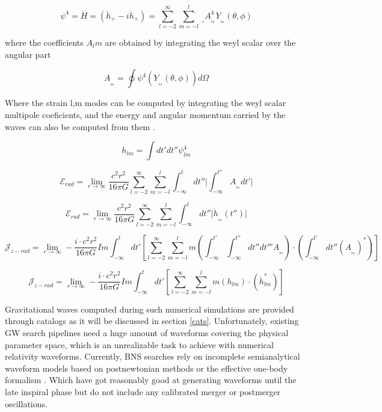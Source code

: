 \begin{equation}
\psi^4 = \ddot{H} = (\ddot{h}_+ - i\ddot{h}_\times) = \sum_{l=-2}^{\infty}  \sum_{m=-l}^{l} {}_{_{_{-2}}}A_{_{_{lm}}}^4 Y_{_{_{lm}}}(\theta, \phi) 
\end{equation}

where the coefficients $A_lm$ are obtained by integrating the weyl scalar over the angular  part 

\begin{equation}
A_{_{_{lm}}} = \oint \psi^4(Y_{_{_{lm}}}(\theta, \phi)) d\Omega
\end{equation}


Where the strain l,m modes can be computed by integrating the weyl scalar multipole coeficients, and the energy and angular momentum carried by the waves can also be computed from them \cite{Ruiz_2007}.

\begin{equation}
h_{lm} = \int dt' dt'' \psi_{lm}^4
\end{equation}

\begin{equation}
\mathcal{E}_{rad} = \lim_{r\to\infty} \frac{c^2 r^2}{16\pi G} \sum_{l=-2}^{\infty}  \sum_{m=-l}^{l} \int_{-\infty}^{t} dt'' \Biggr| \int_{-\infty}^{t''} A_{_{_{lm}}} dt' \Biggr|
\end{equation}

\begin{equation}
\mathcal{E}_{rad} = \lim_{r\to\infty} \frac{c^2 r^2}{16\pi G} \sum_{l=-2}^{\infty}  \sum_{m=-l}^{l} \int_{-\infty}^{t} dt'' \Biggr|  \dot{h}_{_{_{lm}}}(t'')  \Biggr|
\end{equation}


\begin{equation}
\mathcal{J}_{z-rad} = \lim_{r\to\infty} -\frac{i \cdot c^2 r^2}{16\pi G} Im \int_{-\infty}^{t}dt'\left[ \sum_{l=-2}^{\infty} \sum_{m=-l}^{l} m  \left(\int_{-\infty}^{t'} \int_{-\infty}^{t''} dt''dt''' A_{_{_{lm}}}\right)  \cdot \left( \int_{-\infty}^{t'} dt'' (A_{_{_{lm}}})^* \right) \right]
\end{equation}

\begin{equation}
\mathcal{J}_{z-rad} = \lim_{r\to\infty} -\frac{i \cdot c^2 r^2}{16\pi G} Im \int_{-\infty}^{t}dt'\left[ \sum_{l=-2}^{\infty} \sum_{m=-l}^{l} m  \left(h_{lm}\right)  \cdot \left( \dot{h}^*_{lm} \right) \right]
\end{equation}


Gravitational waves computed during such numerical simulations are provided through catalogs as it will be discussed in section \ref{cats}. Unfortunately, existing GW search pipelines need a huge amount of waveforms covering the physical parameter space, which is an unrealizable task to achieve with numerical relativity waveforms.  Currently, BNS searches rely on incomplete semianalytical waveform models based on postnewtonian methods or the effective one-body formalism \cite{Damour:2012yf}. Which have got reasonably good at generating waveforms until the late inspiral phase but do not include any calibrated merger or postmerger oscillations.



